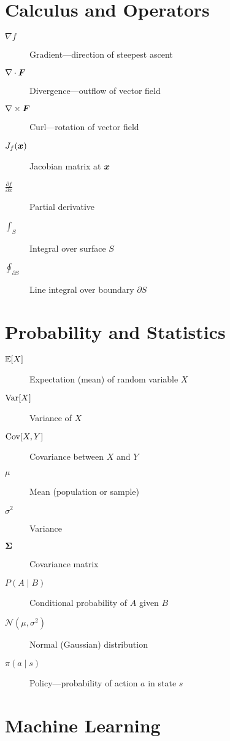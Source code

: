 \section*{Calculus and Operators}

\begin{description}
    \item[$\nabla f$] Gradient---direction of steepest ascent
    \item[$\nabla \cdot \bm{F}$] Divergence---outflow of vector field
    \item[$\nabla \times \bm{F}$] Curl---rotation of vector field
    \item[$J_f(\bm{x})$] Jacobian matrix at $\bm{x}$
    \item[$\frac{\partial f}{\partial x}$] Partial derivative
    \item[$\int_S$] Integral over surface $S$
    \item[$\oint_{\partial S}$] Line integral over boundary $\partial S$
\end{description}

\section*{Probability and Statistics}

\begin{description}
    \item[\ensuremath{\E[X]}] Expectation (mean) of random variable $X$
    \item[\ensuremath{\Var[X]}] Variance of $X$
    \item[\ensuremath{\Cov[X,Y]}] Covariance between $X$ and $Y$
    \item[\ensuremath{\mu}] Mean (population or sample)
    \item[$\sigma^2$] Variance
    \item[$\bm{\Sigma}$] Covariance matrix
    \item[$P(A \mid B)$] Conditional probability of $A$ given $B$
    \item[$\mathcal{N}(\mu, \sigma^2)$] Normal (Gaussian) distribution
    \item[$\pi(a \mid s)$] Policy---probability of action $a$ in state $s$
\end{description}

\section*{Machine Learning}

